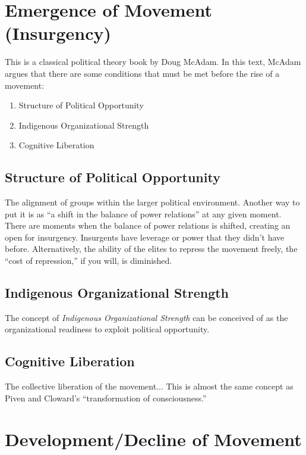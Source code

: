 \vspace{3mm}
\setcounter{section}{0}




\section{Emergence of Movement (Insurgency)}
This is a classical political theory book by Doug McAdam.
In this text, McAdam argues that there are some conditions that must be met before the rise of a movement:
\begin{enumerate}
    \item Structure of Political Opportunity
    \item Indigenous Organizational Strength
    \item Cognitive Liberation
\end{enumerate}

\subsection{Structure of Political Opportunity}
The alignment of groups within the larger political environment.
Another way to put it is as  ``a shift in the balance of power relations'' at any given moment.
There are moments when the balance of power relations is shifted, creating an open for insurgency.
Insurgents have leverage or power that they didn't have before.
Alternatively, the ability of the elites to repress the movement freely, the ``cost of repression,'' if you will, is diminished.

\subsection{Indigenous Organizational Strength}
The concept of \textit{Indigenous Organizational Strength} can be conceived of as the organizational readiness to exploit political opportunity.


\subsection{Cognitive Liberation}
The collective liberation of the movement...
This is almost the same concept as Piven and Cloward's ``transformation of consciousness.''

\section{Development/Decline of Movement}

